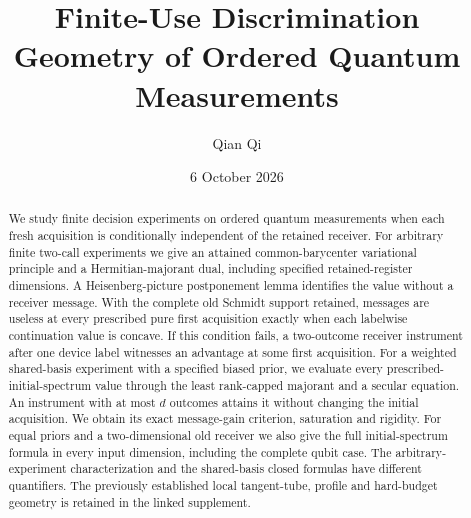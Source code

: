 \documentclass[11pt]{amsart}
\title[Finite-use discrimination geometry]{Finite-Use Discrimination Geometry of Ordered Quantum Measurements}
\author{Qian Qi}
\date{6 October 2026}
\numberwithin{equation}{section}
\theoremstyle{definition}\newtheorem{definition}[theorem]{Definition}
\theoremstyle{remark}\newtheorem{remark}[theorem]{Remark}
\begin{document}
\raggedbottom
\begin{abstract}
We study finite decision experiments on ordered quantum measurements
when each fresh acquisition is conditionally independent of the retained
receiver.  For arbitrary finite two-call experiments we give an attained
common-barycenter variational principle and a Hermitian-majorant dual,
including specified retained-register dimensions.  A Heisenberg-picture
postponement lemma identifies the value without a receiver message.
With the complete old Schmidt support retained, messages are useless at
every prescribed pure first acquisition exactly when each labelwise
continuation value is concave.  If this condition fails, a two-outcome
receiver instrument after one device label witnesses an advantage at
some first acquisition.  For a weighted shared-basis experiment with a
specified biased prior, we evaluate every prescribed-initial-spectrum
value through the least rank-capped majorant and a secular equation.
An instrument with at most $d$ outcomes attains it without changing the
initial acquisition.  We obtain its exact message-gain criterion,
saturation and rigidity.  For equal priors and a two-dimensional old
receiver we also give the full initial-spectrum formula in every input
dimension, including the complete qubit case.  The arbitrary-experiment
characterization and the shared-basis closed formulas have different
quantifiers.  The previously established local tangent-tube, profile
and hard-budget geometry is retained in the linked supplement.
\end{abstract}
\maketitle
\enlargethispage{3pt}












\end{document}
